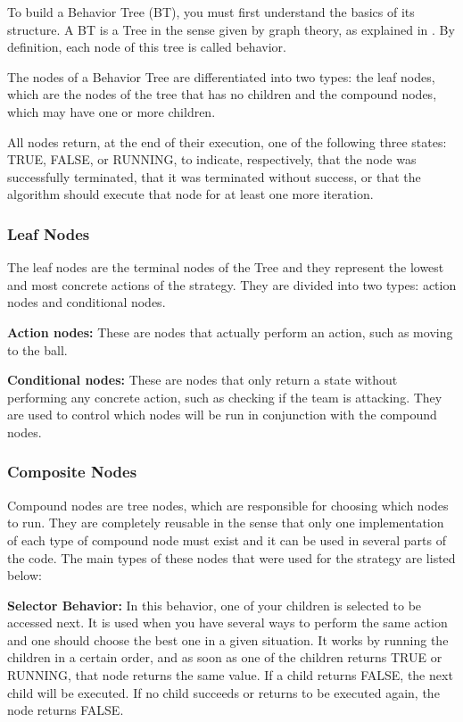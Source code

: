 \documentclass[conference]{IEEEtran}
\begin{document}
To build a Behavior Tree (BT), you must first understand the basics of its structure. A BT is a Tree in the sense given by graph theory, as explained in \cite{west2001introduction}. By definition, each node of this tree is called behavior.

The nodes of a Behavior Tree are differentiated into two types: the leaf nodes, which are the nodes of the tree that has no children and the compound nodes, which may have one or more children.

All nodes return, at the end of their execution, one of the following three states: TRUE, FALSE, or RUNNING, to indicate, respectively, that the node was successfully terminated, that it was terminated without success, or that the algorithm should execute that node for at least one more iteration.

\subsubsection{Leaf Nodes}

The leaf nodes are the terminal nodes of the Tree and they represent the lowest and most concrete actions of the strategy. They are divided into two types: action nodes and conditional nodes.

\textbf{Action nodes:} These are nodes that actually perform an action, such as moving to the ball.

\textbf{Conditional nodes:} These are nodes that only return a state without performing any concrete action, such as checking if the team is attacking. They are used to control which nodes will be run in conjunction with the compound nodes.

\subsubsection{Composite Nodes}

Compound nodes are tree nodes, which are responsible for choosing which nodes to run. They are completely reusable in the sense that only one implementation of each type of compound node must exist and it can be used in several parts of the code. The main types of these nodes that were used for the strategy are listed below:

\textbf{Selector Behavior:} In this behavior, one of your children is selected to be accessed next. It is used when you have several ways to perform the same action and one should choose the best one in a given situation. It works by running the children in a certain order, and as soon as one of the children returns TRUE or RUNNING, that node returns the same value. If a child returns FALSE, the next child will be executed. If no child succeeds or returns to be executed again, the node returns FALSE.
\end{document}

